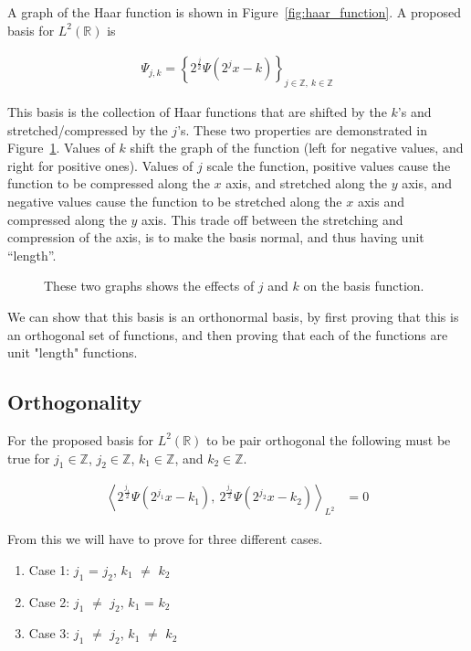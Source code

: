\documentclass[12pt]{amsart}
\newcommand{\Z}{\mathbb{Z}}
\newcommand{\LP}{L^2(\mathbb{R})}
\begin{document}
A graph of the Haar function is shown in Figure~\ref{fig:haar_function}. A proposed basis for $\LP$ is

\begin{align}
  \Psi_{j,k} = \left\{2^{\frac{j}{2}}\Psi\left(2^jx-k\right)\right\}_{j\in\Z,\ k\in\Z}
\end{align}

This basis is the collection of Haar functions that are shifted by the $k$'s and stretched/compressed by the $j$'s. These two properties are demonstrated in Figure~\ref{fig:jk_diff}. Values of $k$ shift the graph of the function (left for negative values, and right for positive ones). Values of $j$ scale the function, positive values cause the function to be compressed along the $x$ axis, and stretched along the $y$ axis, and negative values cause the function to be stretched along the $x$ axis and compressed along the $y$ axis. This trade off between the stretching and compression of the axis, is to make the basis normal, and thus having unit ``length''.

\begin{figure}


\caption{\label{fig:jk_diff}These two graphs shows the effects of $j$ and $k$ on the basis function.}
\end{figure}

We can show that this basis is an orthonormal basis, by first proving that this
is an orthogonal set of functions, and then proving that each of the functions are unit "length" functions.

\subsection{Orthogonality}%
\label{sub:orthogonality}
 For the proposed basis for $\LP$ to be pair orthogonal the following must be true for $j_1\in\Z$, $j_2\in\Z$, $k_1\in\Z$, and $k_2\in\Z$.
 
 \begin{align}
  {\left<2^\frac{j_1}{2}\Psi\left(2^{j_1}x-k_1\right),\ 2^\frac{j_2}{2}\Psi\left(2^{j_2}x-k_2\right)\right>}_{L^2} &= 0
\end{align}

From this we will have to prove for three different cases. 
\begin{enumerate}
\item Case 1: $j_1$ = $j_2$, $k_1$ $\neq$ $k_2$
\item Case 2: $j_1$ $\neq$ $j_2$, $k_1$ = $k_2$
\item Case 3: $j_1$ $\neq$ $j_2$, $k_1$ $\neq$ $k_2$
\end{enumerate}
\end{document}
